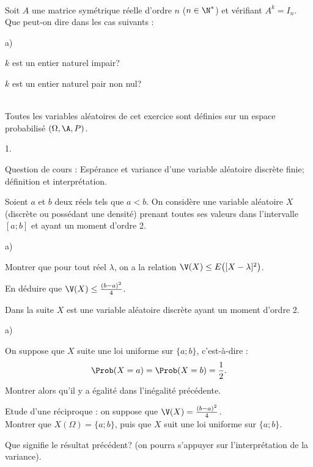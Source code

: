 \documentclass[11pt]{article}%
\begin{document}
\begin{exerciceSP}~\\
  Soit $A$ une matrice symétrique réelle d'ordre $n$ ($n \in \N^*$) et
  vérifiant $A^k = I_n$. \\
  Que peut-on dire dans les cas suivants : 
  \begin{noliste}{a)}
    \setlength{\itemsep}{2mm}
  \item $k$ est un entier naturel impair?
  \item $k$ est un entier naturel pair non nul?
  \end{noliste}
\end{exerciceSP}


\newpage


\begin{exerciceAP}~\\
  Toutes les variables aléatoires de cet exercice sont définies sur un
  espace probabilisé $(\Omega , \A , P)$.
  \begin{noliste}{1.}
    \setlength{\itemsep}{2mm}
  \item Question de cours : Espérance et variance d'une variable
    aléatoire discrète finie; définition et interprétation.
  \item Soient $a$ et $b$ deux réels tels que $a < b$. On considère
    une variable aléatoire $X$ (discrète ou possédant une densité)
    prenant toutes ses valeurs dans l'intervalle $[a ; b]$ et ayant un
    moment d'ordre 2.
    \begin{noliste}{a)}
    \setlength{\itemsep}{2mm} 
    \item Montrer que pour tout réel $\lambda$, on a la relation
      $\V(X) \leq E \big( [ X - \lambda]^2 \big)$.
    \item En déduire que $\V(X) \leq \frac{(b-a)^2}{4}$.
    \end{noliste}
  \item Dans la suite $X$ est une variable aléatoire discrète ayant un
    moment d'ordre 2.
    \begin{noliste}{a)}
    \setlength{\itemsep}{2mm} 
    \item On suppose que $X$ suite une loi uniforme sur $\{ a ; b \}$,
      c'est-à-dire :
      \[
      \Prob(X=a) = \Prob(X=b) = \frac{1}{2}.
      \]
      Montrer alors qu'il y a égalité dans l'inégalité précédente.
    \item Etude d'une réciproque : on suppose que $\V(X) =
      \frac{(b-a)^2}{4}$.\\
      Montrer que $X(\Omega) = \{ a ; b \}$, puis que $X$ suit une loi
      uniforme sur $\{ a ; b \}$.
    \end{noliste}
  \item Que signifie le résultat précédent? (on pourra s'appuyer sur
    l'interprétation de la variance).
  \end{noliste}
\end{exerciceAP}
\end{document}
